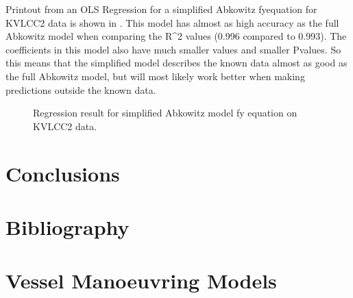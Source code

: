 \documentclass[review]{elsarticle}
\begin{document}
\sphinxAtStartPar
Printout from an OLS Regression for a simplified Abkowitz fy\sphinxhyphen{}equation for KVLCC2 data is shown in {\hyperref[\detokenize{05.01_model_tests:regression-simple-summary}]{}}. This model has almost as high accuracy as the full Abkowitz model when comparing the R\textasciicircum{}2 values (0.996 compared to 0.993). The coefficients in this model also have much smaller values and smaller P\sphinxhyphen{}values. So this means that the simplified model describes the known data almost as good as the full Abkowitz model, but will most likely work better when making predictions outside the known data.

\begin{figure}[htbp]
\centering
\capstart

\noindent{}
\caption{Regression result for simplified Abkowitz model fy equation on KVLCC2 data.}\label{\detokenize{05.01_model_tests:regression-simple-summary}}\end{figure}


\section{Conclusions}
\label{\detokenize{10.00_conclusions:conclusions}}\label{\detokenize{10.00_conclusions::doc}}

\section{Bibliography}
\label{\detokenize{bibligraphy:bibliography}}\label{\detokenize{bibligraphy::doc}}
\sphinxAtStartPar



\section{Vessel Manoeuvring Models}
\label{\detokenize{appendix_vmms:vessel-manoeuvring-models}}\label{\detokenize{appendix_vmms::doc}}
\end{document}
